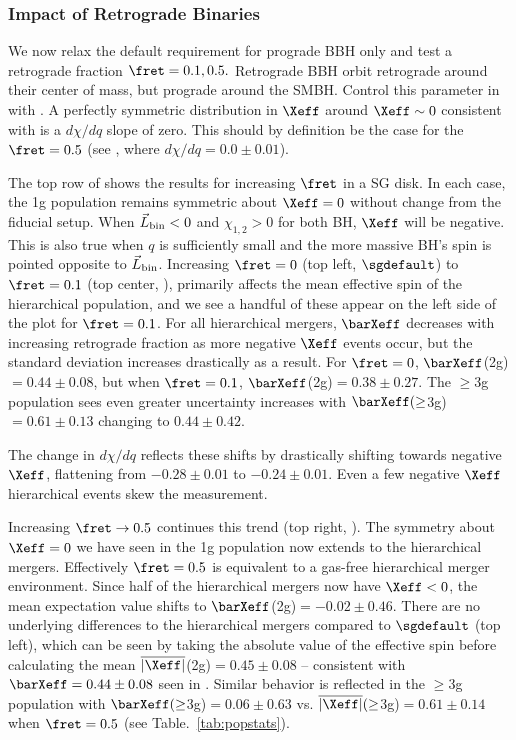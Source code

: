 \subsubsection{Impact of Retrograde Binaries}
\label{sec:retro-results}
We now relax the default requirement for prograde BBH only and test a retrograde fraction $\fret=0.1,0.5.$ Retrograde BBH orbit retrograde around their center of mass, but prograde around the SMBH.
Control this parameter in  with .
A perfectly symmetric  distribution in $\Xeff$ around $\Xeff \sim 0$ consistent with is a $d\chi/dq$ slope of zero.
This should by definition be the case for the $\fret=0.5$ (see , where $d\chi/dq=0.0\pm0.01$).

The top row of  shows the results for increasing $\fret$ in a SG disk.
In each case, the 1g population remains symmetric about $\Xeff=0$ without change from the fiducial setup.
When $\vec{L}_{\rm bin}<0$ and $\chi_{1,2}>0$ for both BH, $\Xeff$ will be negative.
This is also true when $q$ is sufficiently small and the more massive BH's spin is pointed opposite to $\vec{L}_{\rm bin}$.
Increasing  $\fret=0$ (top left, $\sgdefault$) to $\fret=0.1$ (top center, ), primarily affects the mean effective spin of the hierarchical population, and we see a handful of these appear on the left side of the plot for $\fret=0.1$.
For all hierarchical mergers, $\barXeff$ decreases with increasing retrograde fraction as more negative $\Xeff$ events occur, but the standard deviation increases drastically as a result.
For $\fret=0$, $\barXeff$(2g)$=0.44\pm0.08$, but when $\fret=0.1$, $\barXeff$(2g)$=0.38\pm0.27$.
The $\geq$3g population sees even greater uncertainty increases with $\barXeff(\geq$3g)$=0.61\pm0.13$ changing to $0.44\pm0.42$.

The change in $d\chi/dq$ reflects these shifts by drastically shifting towards negative $\Xeff$, flattening from $-0.28\pm0.01$ to $-0.24\pm0.01$.
Even a few negative $\Xeff$ hierarchical events skew the measurement.

Increasing $\fret \rightarrow 0.5$ continues this trend (top right, ).
The symmetry about $\Xeff=0$ we have seen in the 1g population now extends to the hierarchical mergers.
Effectively $\fret=0.5$ is equivalent to a gas-free hierarchical merger environment.
Since half of the hierarchical mergers now have $\Xeff<0$, the mean expectation value shifts to $\barXeff$(2g)$=-0.02\pm0.46$.
There are no underlying differences to the hierarchical mergers compared to $\sgdefault$ (top left), which can be seen by taking the absolute value of the effective spin before calculating the mean $\overline{|\Xeff|}$(2g)$=0.45\pm0.08$ -- consistent with $\barXeff=0.44\pm0.08$ seen in \sgdefault.
Similar behavior is reflected in the $\geq$3g population with $\barXeff(\geq$3g)$=0.06\pm0.63$ vs.
$\overline{|\Xeff|}(\geq$3g)$=0.61\pm0.14$ when $\fret=0.5$ (see Table.~\ref{tab:popstats}).

